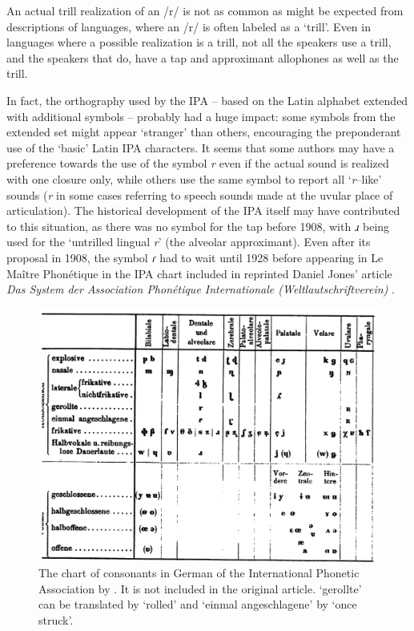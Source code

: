 \begin{displayquote}
An actual trill realization of an /r/ is not as common as might be expected from descriptions of languages, where an /r/ is often labeled as a ‘trill’. Even in languages where a possible realization is a trill, not all the speakers use a trill, and the speakers that do, have a tap and approximant allophones as well as the trill. \parencite[161]{lindauStory1985}
\end{displayquote}

In fact, the orthography used by the IPA – based on the Latin alphabet extended with additional symbols – probably had a huge impact: some symbols from the extended set might appear ‘stranger’ than others, encouraging the preponderant use of the ‘basic’ Latin IPA characters. It seems that some authors may have a preference towards the use of the symbol \textit{r} even if the actual sound is realized with one closure only, while others use the same symbol to report all ‘\textit{r}–like’ sounds (\textit{r} in some cases referring to speech sounds made at the uvular place of articulation). The historical development of the IPA itself may have contributed to this situation, as there was no symbol for the tap before 1908, with \textit{ɹ} being used for the ‘untrilled lingual \textit{r}’ (the alveolar approximant). Even after its proposal in 1908, the symbol \textit{ɾ} had to wait until 1928 before appearing in Le Maître Phonétique in the IPA chart included in reprinted Daniel Jones' article \textit{Das System der Association Phonétique Internationale (Weltlautschriftverein)} \parencite*{jonesSystemAssociationPhonetique1928}.\\

\begin{figure}
	\centering
	\includegraphics[width=1\linewidth]{jipa/images/jones_table}
	\caption[Chart of consonants in German of the International Phonetic Association by \parencite{jonesSystemAssociationPhonetique1928}]{The chart of consonants in German of the International Phonetic Association by \parencite[23]{jonesSystemAssociationPhonetique1928}. It is not included in the original article. ‘gerollte’ can be translated by ‘rolled’ and ‘einmal angeschlagene’ by ‘once struck’.}
	\label{fig:jonestable}
\end{figure}

